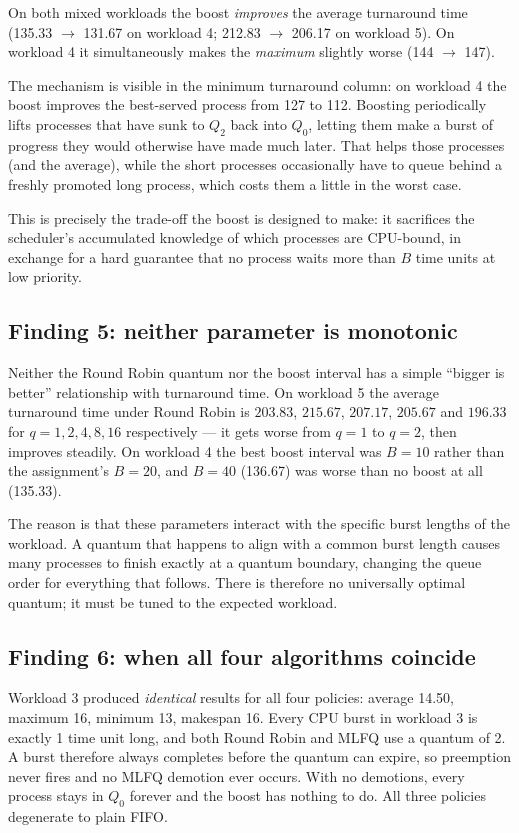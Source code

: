 \documentclass[11pt,a4paper]{article}
\begin{document}
On both mixed workloads the boost \emph{improves} the average turnaround time
(135.33 $\rightarrow$ 131.67 on workload 4; 212.83 $\rightarrow$ 206.17 on workload 5). On workload 4
it simultaneously makes the \emph{maximum} slightly worse (144 $\rightarrow$ 147).

The mechanism is visible in the minimum turnaround column: on workload 4 the boost improves
the best-served process from 127 to 112. Boosting periodically lifts processes that have sunk
to $Q_2$ back into $Q_0$, letting them make a burst of progress they would otherwise have
made much later. That helps those processes (and the average), while the short processes
occasionally have to queue behind a freshly promoted long process, which costs them a little
in the worst case.

This is precisely the trade-off the boost is designed to make: it sacrifices the
scheduler's accumulated knowledge of which processes are CPU-bound, in exchange for a hard
guarantee that no process waits more than $B$ time units at low priority.

\subsection{Finding 5: neither parameter is monotonic}

Neither the Round Robin quantum nor the boost interval has a simple ``bigger is better''
relationship with turnaround time. On workload 5 the average turnaround time under Round
Robin is $203.83$, $215.67$, $207.17$, $205.67$ and $196.33$ for $q=1,2,4,8,16$ respectively --- it gets
worse from $q=1$ to $q=2$, then improves steadily. On workload 4 the best boost interval was
$B=10$ rather than the assignment's $B=20$, and $B=40$ (136.67) was worse than no boost at all
(135.33).

The reason is that these parameters interact with the specific burst lengths of the
workload. A quantum that happens to align with a common burst length causes many processes
to finish exactly at a quantum boundary, changing the queue order for everything that
follows. There is therefore no universally optimal quantum; it must be tuned to the expected
workload.

\subsection{Finding 6: when all four algorithms coincide}

Workload 3 produced \emph{identical} results for all four policies: average 14.50, maximum
16, minimum 13, makespan 16. Every CPU burst in workload 3 is exactly 1 time unit long, and
both Round Robin and MLFQ use a quantum of 2. A burst therefore always completes before the
quantum can expire, so preemption never fires and no MLFQ demotion ever occurs. With no
demotions, every process stays in $Q_0$ forever and the boost has nothing to do. All three
policies degenerate to plain FIFO.
\end{document}
